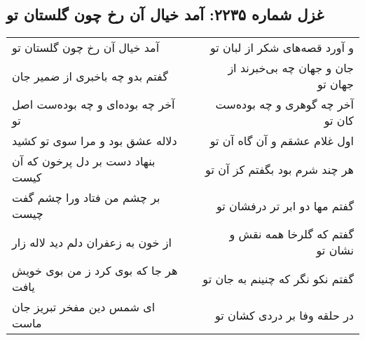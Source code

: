 \begin{center}
\section*{غزل شماره ۲۲۳۵: آمد خیال آن رخ چون گلستان تو}
\label{sec:2235}
\begin{longtable}{l p{0.5cm} r}
آمد خیال آن رخ چون گلستان تو
&&
و آورد قصه‌های شکر از لبان تو
\\
گفتم بدو چه باخبری از ضمیر جان
&&
جان و جهان چه بی‌خبرند از جهان تو
\\
آخر چه بوده‌ای و چه بوده‌ست اصل تو
&&
آخر چه گوهری و چه بوده‌ست کان تو
\\
دلاله عشق بود و مرا سوی تو کشید
&&
اول غلام عشقم و آن گاه آن تو
\\
بنهاد دست بر دل پرخون که آن کیست
&&
هر چند شرم بود بگفتم کز آن تو
\\
بر چشم من فتاد ورا چشم گفت چیست
&&
گفتم مها دو ابر تر درفشان تو
\\
از خون به زعفران دلم دید لاله زار
&&
گفتم که گلرخا همه نقش و نشان تو
\\
هر جا که بوی کرد ز من بوی خویش یافت
&&
گفتم نکو نگر که چنینم به جان تو
\\
ای شمس دین مفخر تبریز جان ماست
&&
در حلقه وفا بر دردی کشان تو
\\
\end{longtable}
\end{center}
